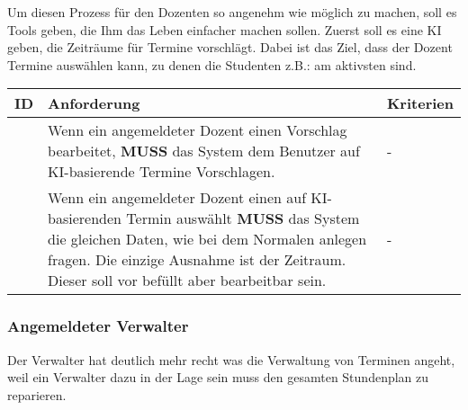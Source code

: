 \newpage

Um diesen Prozess für den Dozenten so angenehm wie möglich zu machen, soll es Tools geben, die Ihm das Leben einfacher machen sollen. Zuerst soll es eine KI geben, die Zeiträume für Termine vorschlägt. Dabei ist das Ziel, dass der Dozent Termine auswählen kann, zu denen die Studenten z.B.: am aktivsten sind. 

\vspace{12pt}

\begin{tabular} {|p{}|p{}|p{}|}
	\hline
	ID & Anforderung & Kriterien \\
	\hline
	\printfreqnr
	& Wenn ein angemeldeter Dozent einen Vorschlag bearbeitet, \textbf{MUSS} das System dem Benutzer auf KI-basierende Termine Vorschlagen. 
	& - \\
	\hline
	\printfreqnr
	& Wenn ein angemeldeter Dozent einen auf KI-basierenden Termin auswählt \textbf{MUSS} das System die gleichen Daten, wie bei dem Normalen anlegen fragen. Die einzige Ausnahme ist der Zeitraum. Dieser soll vor befüllt aber bearbeitbar sein. 
	& - \\
	\hline
\end{tabular}


\newpage

\subsubsection{Angemeldeter Verwalter}
Der Verwalter hat deutlich mehr recht was die Verwaltung von Terminen angeht, weil ein Verwalter dazu in der Lage sein muss den gesamten Stundenplan zu reparieren. 

\vspace{12pt}

